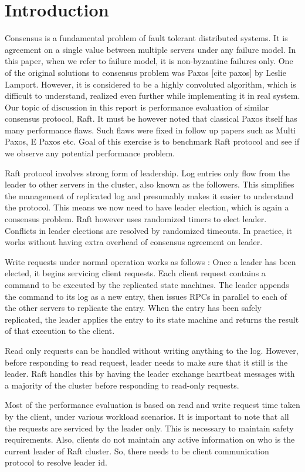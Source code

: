 \section{Introduction}
 
Consensus is a fundamental problem of fault tolerant distributed systems. It is agreement on a single value between multiple servers under any failure model. In this paper, when we refer to failure model, it is non-byzantine failures only. One of the original solutions to consensus problem was Paxos [cite paxos] by Leslie Lamport. However, it is considered to be a highly convoluted algorithm, which is difficult to understand, realized even further while implementing it in real system. Our topic of discussion in this report is performance evaluation of similar consensus protocol, Raft. It must be however noted that classical Paxos itself has many performance flaws. Such flaws were fixed in follow up papers such as Multi Paxos, E Paxos etc. Goal of this exercise is to benchmark Raft protocol and see if we observe any potential performance problem. 

Raft protocol involves strong form of leadership. Log entries only flow from the leader to other servers in the cluster, also known as the followers. This simplifies the management of replicated log and presumably makes it easier to understand the protocol. This means we now need to have leader election, which is again a consensus problem. Raft however uses randomized timers to elect leader. Conflicts in leader elections are resolved by randomized timeouts. In practice, it works without having extra overhead of consensus agreement on leader. 

Write requests under normal operation works as follows : Once a leader has been elected, it begins servicing client requests. Each client request contains a command to be executed by the replicated state machines. The leader appends the command to its log as a new entry, then issues RPCs in parallel to each of the other servers to replicate the entry. When the entry has been safely replicated, the leader applies the entry to its state machine and returns the result of that execution to the client. 

Read only requests can be handled without writing anything to the log. However, before responding to read request, leader needs to make sure that it still is the leader. Raft handles this by having the leader exchange heartbeat messages with a majority of the cluster before responding to read-only requests.

Most of the performance evaluation is based on read and write request time taken by the client, under various workload scenarios. It is important to note that all the requests are serviced by the leader only. This is necessary to maintain safety requirements. Also, clients do not maintain any active information on who is the current leader of Raft cluster. So, there needs to be client communication protocol to resolve leader id. 
